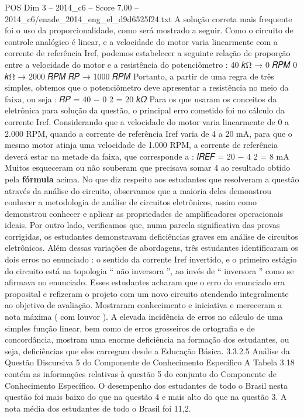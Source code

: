 \begin{textsample}{POS Dim 3 – 2014\_c6 – Score 7.00 – 2014\_c6/enade\_2014\_eng\_el\_d9d6525f24.txt}
A solução correta mais frequente foi o uso da proporcionalidade, como será mostrado a seguir.
Como o circuito de controle analógico é linear, e a velocidade do motor varia linearmente com a corrente de referência Iref, podemos estabelecer a seguinte relação de proporção entre a velocidade do motor e a resistência do potenciômetro : 40 𝑘Ω → 0 𝑅𝑃𝑀 0 𝑘Ω → 2000 𝑅𝑃𝑀 𝑅𝑃 → 1000 𝑅𝑃𝑀 Portanto, a partir de uma regra de três simples, obtemos que o potenciômetro deve apresentar a resistência no meio da faixa, ou seja : 𝑅𝑃 = 40 − 0 2 = 20 𝑘𝛺 Para os que usaram os conceitos da eletrônica para solução da questão, o principal erro cometido foi no cálculo da corrente Iref.
Considerando que a velocidade do motor varia linearmente de 0 a 2.000 RPM, quando a corrente de referência Iref varia de 4 a 20 mA, para que o mesmo motor atinja uma velocidade de 1.000 RPM, a corrente de referência deverá estar na metade da faixa, que corresponde a : 𝐼𝑅𝐸𝐹 = 20 − 4 2 = 8 mA Muitos esqueceram ou não souberam que precisava somar 4 ao resultado obtido pela \textbf{fórmula} acima.
No que diz respeito aos estudantes que resolveram a questão através da análise do circuito, observamos que a maioria deles demonstrou conhecer a metodologia de análise de circuitos eletrônicos, assim como demonstrou conhecer e aplicar as propriedades de amplificadores operacionais ideais.
Por outro lado, verificamos que, numa parcela significativa das provas corrigidas, os estudantes demonstravam deficiências graves em análise de circuitos eletrônicos.
Além dessas variações de abordagens, três estudantes identificaram os dois erros no enunciado : o sentido da corrente Iref invertido, e o primeiro estágio do circuito está na topologia “ não inversora ”, ao invés de “ inversora ” como se afirmava no enunciado.
Esses estudantes acharam que o erro do enunciado era proposital e refizeram o projeto com um novo circuito atendendo integralmente ao objetivo de avaliação.
Mostraram conhecimento e iniciativa e mereceram a nota máxima ( com louvor ).
A elevada incidência de erros no cálculo de uma simples função linear, bem como de erros grosseiros de ortografia e de concordância, mostram uma enorme deficiência na formação dos estudantes, ou seja, deficiências que eles carregam desde a Educação Básica. 3.3.2.5 Análise da Questão Discursiva 5 do Componente de Conhecimento Específico A Tabela 3.18 contém as informações relativas à questão 5 do conjunto do Componente de Conhecimento Específico.
O desempenho dos estudantes de todo o Brasil nesta questão foi mais baixo do que na questão 4 e mais alto do que na questão 3.
A nota média dos estudantes de todo o Brasil foi 11,2.

\end{textsample}
